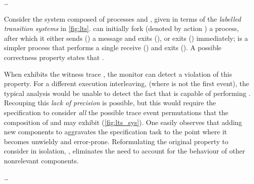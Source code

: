 \ldots
 
\begin{example}\label{eg:local}
  Consider the system \kSys composed of processes \kP and \kQ, given in terms of the \emph{labelled transition systems} in \cref{fig:lts}.
  \kP can initially fork (denoted by action ) a process, after which it either sends () a message and exits (), or exits () immediately; \kQ is a simpler process that performs a single receive () and exits ().
  A possible correctness property states that .

  \medskip
  When \kSys exhibits the witness trace , the monitor can detect a violation of this property.
  For a different execution interleaving, \eg {} (where  is not the first event), the typical \RV analysis would be unable to detect the fact that \kSys is capable of performing .
  Recouping this \emph{lack of precision} is possible, but this would require the specification to consider \emph{all} the possible trace event permutations that the composition of \kP and \kQ may exhibit (\cref{fig:lts_sys}). 
  One easily observes that adding new components to \kSys aggravates the specification task to the point where it becomes unwieldy and error-prone.
  Reformulating the original property to consider \kP in isolation, \ie {}, eliminates the need to account for the behaviour of other nonrelevant components.
\end{example}

\ldots

